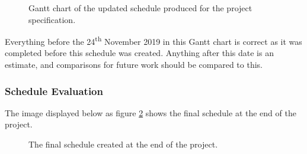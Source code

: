 \documentclass{article}
\begin{document}
\begin{figure}[H]
	\centering
	\caption{Gantt chart of the updated schedule produced for the project specification.}
	\label{figure:progressReportGanttChart}
\end{figure}

Everything before the 24\textsuperscript{th} November 2019 in this Gantt chart is correct as it was completed before this schedule was created. Anything after this date is an estimate, and comparisons for future work should be compared to this. \par

\subsubsection{Schedule Evaluation}

The image displayed below as figure \ref{figure:finalSchedule} shows the final schedule at the end of the project. \par

\begin{figure}[H]
	\centering
	\caption{The final schedule created at the end of the project.}
	\label{figure:finalSchedule}
\end{figure} 
\end{document}
